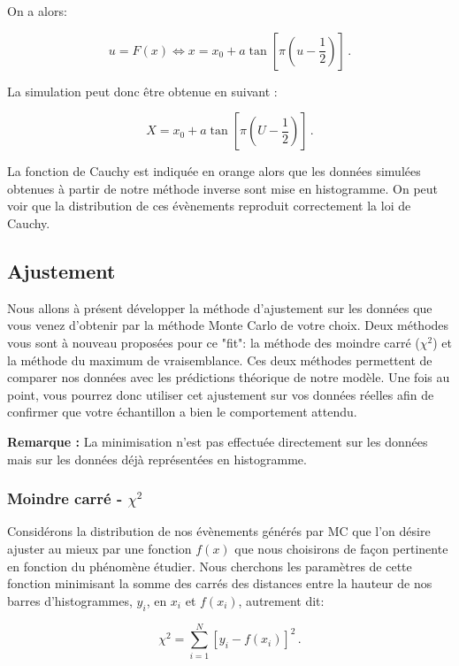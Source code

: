 On a alors:

\begin{equation}
u = F(x) \Longleftrightarrow x = x_{0} + a \tan \left[ \pi  \left(u - \frac{1}{2} \right)  \right] \, .
\end{equation}

La simulation peut donc être obtenue en suivant :

\begin{equation}
X = x_{0} + a \tan \left[ \pi  \left(U - \frac{1}{2} \right)  \right] \, .
\end{equation}

La fonction de Cauchy est indiquée en orange alors que les données simulées obtenues à partir de notre méthode inverse sont mise en histogramme. On peut voir que la distribution de ces évènements reproduit correctement la loi de Cauchy.

\subsection{Ajustement}
Nous allons à présent développer la méthode d'ajustement sur les données que vous venez d'obtenir par la méthode Monte Carlo de votre choix. Deux méthodes vous sont à nouveau proposées pour ce "fit": la méthode des moindre carré ($\chi^2$) et la méthode du maximum de vraisemblance. Ces deux méthodes permettent de comparer nos données avec les prédictions théorique de notre modèle. Une fois au point, vous pourrez donc utiliser cet ajustement sur vos données réelles afin de confirmer que votre échantillon a bien le comportement attendu. 

\textbf{Remarque :} La minimisation n'est pas effectuée directement sur les données mais sur les données déjà représentées en histogramme.

\subsubsection{Moindre carré - $\chi^{2}$}
Considérons la distribution de nos évènements générés par MC  que l'on désire ajuster au mieux par une fonction $f(x)$ que nous choisirons de façon pertinente en fonction du phénomène étudier. Nous cherchons les paramètres de cette fonction minimisant la somme des carrés des distances entre la hauteur de nos barres d'histogrammes, $y_i$, en $x_i$ et $f(x_i)$, autrement dit:

\begin{equation}
\chi^2 = \sum_{i=1}^{N} \left[ y_i - f(x_i) \right]^2 \, .
\end{equation}

